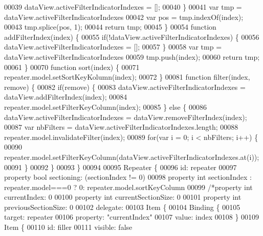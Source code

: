 \begin{DoxyCode}
00039             dataView.activeFilterIndicatorIndexes = [];
00040         \}
00041         var tmp = dataView.activeFilterIndicatorIndexes
00042         var pos = tmp.indexOf(index);
00043         tmp.splice(pos, 1);
00044         \textcolor{keywordflow}{return} tmp;
00045     \}
00054     \textcolor{keyword}{function} addFilterIndex(index) \{
00055         \textcolor{keywordflow}{if}(!dataView.activeFilterIndicatorIndexes) \{
00056             dataView.activeFilterIndicatorIndexes = [];
00057         \}
00058         var tmp = dataView.activeFilterIndicatorIndexes
00059         tmp.push(index);
00060         \textcolor{keywordflow}{return} tmp;
00061     \}
00070     \textcolor{keyword}{function} sort(index) \{
00071         repeater.model.setSortKeyKolumn(index);
00072     \}
00081     \textcolor{keyword}{function} filter(index, \textcolor{keyword}{remove}) \{
00082         \textcolor{keywordflow}{if}(\textcolor{keyword}{remove}) \{
00083             dataView.activeFilterIndicatorIndexes = dataView.addFilterIndex(index);
00084             repeater.model.setFilterKeyColumn(index);
00085         \} \textcolor{keywordflow}{else} \{
00086             dataView.activeFilterIndicatorIndexes = dataView.removeFilterIndex(index);
00087             var nbFilters = dataView.activeFilterIndicatorIndexes.length;
00088             repeater.model.invalidateFilter(index);
00089             \textcolor{keywordflow}{for}(var i = 0; i < nbFilters; i++) \{
00090                 repeater.model.setFilterKeyColumn(dataView.activeFilterIndicatorIndexes.at(i));
00091             \}
00092         \}
00093     \}
00094 
00095     Repeater \{
00096         \textcolor{keywordtype}{id}: repeater
00097         \textcolor{keyword}{property} \textcolor{keywordtype}{bool} sectioning: (sectionIndex != 0)
00098         property \textcolor{keywordtype}{int} sectionIndex : repeater.model===0 ? 0: repeater.model.sortKeyColumn
00099         \textcolor{comment}{/*property int currentIndex: 0}
00100 \textcolor{comment}{        property int currentSectionSize: 0}
00101 \textcolor{comment}{        property int previousSectionSize: 0}
00102 \textcolor{comment}{        delegate:}
00103 \textcolor{comment}{            Item \{}
00104 \textcolor{comment}{            Binding \{}
00105 \textcolor{comment}{                target: repeater}
00106 \textcolor{comment}{                property: "currentIndex"}
00107 \textcolor{comment}{                value: index}
00108 \textcolor{comment}{            \}}
00109 \textcolor{comment}{            Item \{}
00110 \textcolor{comment}{                id: filler}
00111 \textcolor{comment}{                visible: false}

\end{DoxyCode}
